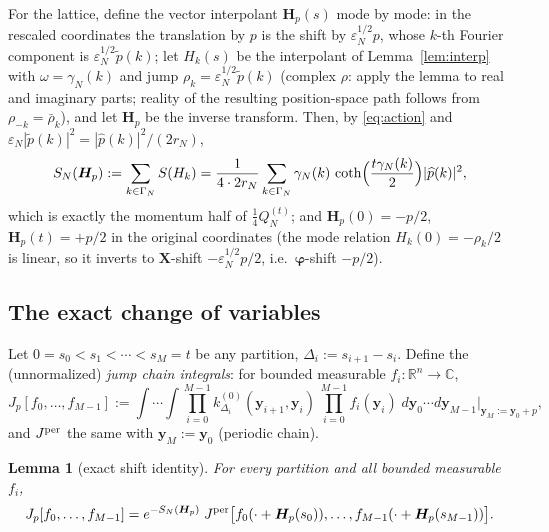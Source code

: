 \documentclass[11pt,a4paper]{article}
\theoremstyle{plain}
\newtheorem{lemma}[theorem]{Lemma}
\theoremstyle{definition}
\newcommand{\R}{\mathbb{R}}
\newcommand{\C}{\mathbb{C}}
\newcommand{\eps}{\varepsilon}
\DeclareMathOperator{\cth}{coth}
\begin{document}
For the lattice, define the vector interpolant $\bm H_p(s)$ mode by mode: in
the rescaled coordinates the translation by $p$ is the shift by
$\eps_N^{1/2}p$, whose $k$-th Fourier component is
$\eps_N^{1/2}\widetilde p(k)$; let $H_k(s)$ be the interpolant of
Lemma~\ref{lem:interp} with $\omega=\gamma_N(k)$ and jump
$\rho_k=\eps_N^{1/2}\widetilde p(k)$ (complex $\rho$: apply the lemma to real
and imaginary parts; reality of the resulting position-space path follows from
$\rho_{-k}=\bar\rho_k$), and let $\bm H_p$ be the inverse transform. Then, by
\eqref{eq:action} and $\eps_N|\widetilde p(k)|^2=|\widehat p(k)|^2/(2r_N)$,
\begin{equation}
 S_N(\bm H_p):=\sum_{k\in\Gamma_N}S(H_k)
 =\frac1{4\cdot 2r_N}\sum_{k\in\Gamma_N}
 \gamma_N(k)\,\cth\Bigl(\frac{t\gamma_N(k)}2\Bigr)|\widehat p(k)|^2 ,
 \label{eq:SNp}
\end{equation}
which is exactly the momentum half of $\tfrac14Q^{(t)}_N$; and
$\bm H_p(0)=-p/2$, $\bm H_p(t)=+p/2$ in the original coordinates
(the mode relation $H_k(0)=-\rho_k/2$ is linear, so it inverts to
$\bm X$-shift $-\eps_N^{1/2}p/2$, i.e.\ $\bm\varphi$-shift $-p/2$).

\subsection{The exact change of variables}

Let $0=s_0<s_1<\cdots<s_M=t$ be any partition,
$\Delta_i:=s_{i+1}-s_i$. Define the (unnormalized) \emph{jump chain
integrals}: for bounded measurable $f_i:\R^n\to\C$,
\[
 J_p[f_0,\dots,f_{M-1}]
 :=\int\!\cdots\!\int
 \prod_{i=0}^{M-1}k^{(0)}_{\Delta_i}(\bm y_{i+1},\bm y_i)\,
 \prod_{i=0}^{M-1}f_i(\bm y_i)\;d\bm y_0\cdots d\bm y_{M-1}
 \Bigg|_{\bm y_M:=\bm y_0+p} ,
\]
and $J^{\rm per}$ the same with $\bm y_M:=\bm y_0$ (periodic chain).

\begin{lemma}[exact shift identity]\label{lem:shift}
For every partition and all bounded measurable $f_i$,
\begin{equation}
 J_p[f_0,\dots,f_{M-1}]
 =e^{-S_N(\bm H_p)}\;
 J^{\rm per}\bigl[f_0(\cdot+\bm H_p(s_0)),\dots,
 f_{M-1}(\cdot+\bm H_p(s_{M-1}))\bigr].
 \label{eq:shiftid}
\end{equation}
\end{lemma}
\end{document}
